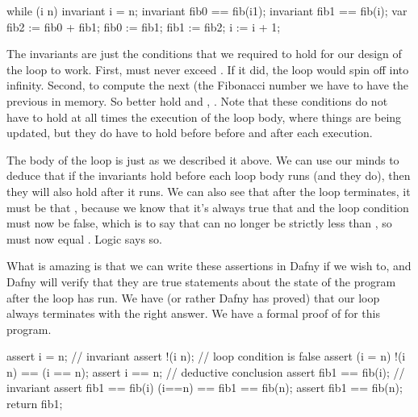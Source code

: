 \documentclass[letterpaper,10pt,english]{sphinxmanual}
\begin{document}
\begin{sphinxVerbatim}[commandchars=\\\{\}]
while (i \PYGZlt{} n)
    invariant i \PYGZlt{}= n;
    invariant fib0 == fib(i\PYGZhy{}1);
    invariant fib1 == fib(i);
\PYGZob{}
    var fib2 := fib0 + fib1;
    fib0 := fib1;
    fib1 := fib2;
    i := i + 1;
\PYGZcb{}
\end{sphinxVerbatim}

The invariants are just the conditions that we required to hold for
our design of the loop to work. First,  must never exceed . If
it did, the loop would spin off into infinity. Second, to compute the
next (the  Fibonacci number we have to have the previous 
in memory. So  better hold  and , . Note
that these conditions do not have to hold at all times  the
execution of the loop body, where things are being updated, but they
do have to hold before before and after each execution.

The body of the loop is just as we described it above. We can use our
minds to deduce that if the invariants hold before each loop body runs
(and they do), then they will also hold after it runs. We can also see
that after the loop terminates, it must be that , because we
know that it’s always true that  and the loop condition must
now be false, which is to say that  can no longer be strictly less
than , so  must now equal . Logic says so.

What is amazing is that we can write these assertions in Dafny if we
wish to, and Dafny will verify that they are true statements about the
state of the program after the loop has run. We have  (or
rather Dafny has proved) that our loop always terminates with the
right answer. We have a formal proof of  for this
program.

\begin{sphinxVerbatim}[commandchars=\\\{\}]
assert i \PYGZlt{}= n;      // invariant
assert !(i \PYGZlt{} n);    // loop condition is false
assert (i \PYGZlt{}= n) \PYGZam{}\PYGZam{} !(i \PYGZlt{} n) ==\PYGZgt{} (i == n);
assert i == n;      // deductive conclusion
assert fib1 == fib(i); // invariant
assert fib1 == fib(i) \PYGZam{}\PYGZam{} (i==n) ==\PYGZgt{} fib1 == fib(n);
assert fib1 == fib(n);
return fib1;
\end{sphinxVerbatim}
\end{document}
